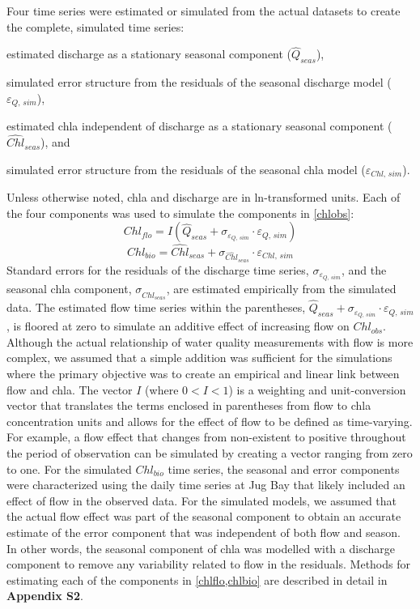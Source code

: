\documentclass[letterpaper,12pt,oneside]{article}\usepackage[]{graphicx}\usepackage[]{color}
\begin{document}
Four time series were estimated or simulated from the actual datasets to create the complete, simulated time series:\begin{inparaenum}[1\upshape)]
\item estimated discharge as a stationary seasonal component ($\widehat{Q}_{seas}$),
\item simulated error structure from the residuals of the seasonal discharge model ($\varepsilon_{Q,\,sim}$), 
\item estimated \ac{chla} independent of discharge as a stationary seasonal component ($\widehat{Chl}_{seas}$), and
\item simulated error structure from the residuals of the seasonal \ac{chla} model ($\varepsilon_{Chl,\,sim}$).
\end{inparaenum}
Unless otherwise noted, \ac{chla} and discharge are in ln-transformed units.  Each of the four components was used to simulate the components in \cref{chlobs}:
\begin{equation} \label{chlflo}
Chl_{flo} = I\left(\widehat{Q}_{seas} + \sigma_{\varepsilon_{Q,\,sim}}\cdot\varepsilon_{Q,\,sim}\right)
\end{equation}
\begin{equation} \label{chlbio}
Chl_{bio} = \widehat{Chl}_{seas} + \sigma_{\widehat{Chl}_{seas}}\cdot\varepsilon_{Chl,\,sim}
\end{equation}
Standard errors for the residuals of the discharge time series, $\sigma_{\varepsilon_{Q,\,sim}}$, and the seasonal \ac{chla} component, $\sigma_{\widehat{Chl}_{seas}}$, are estimated empirically from the simulated data.  The estimated flow time series within the parentheses, $\widehat{Q}_{seas} + \sigma_{\varepsilon_{Q,\,sim}}\cdot\varepsilon_{Q,\,sim}$, is floored at zero to simulate an additive effect of increasing flow on $Chl_{obs}$.  Although the actual relationship of water quality measurements with flow is more complex, we assumed that a simple addition was sufficient for the simulations where the primary objective was to create an empirical and linear link between flow and \ac{chla}. The vector $I$  (where $0 < I < 1$) is a weighting and unit-conversion vector that translates the terms enclosed in parentheses from flow to \ac{chla} concentration units and allows for the effect of flow to be defined as time-varying. For example, a flow effect that changes from non-existent to positive throughout the period of observation can be simulated by creating a vector ranging from zero to one. For the simulated $Chl_{bio}$ time series, the seasonal and error components were characterized using the daily time series at Jug Bay that likely included an effect of flow in the observed data.  For the simulated models, we assumed that the actual flow effect was part of the seasonal component to obtain an accurate estimate of the error component that was independent of both flow and season.  In other words, the seasonal component of \ac{chla} was modelled with a discharge component to remove any variability related to flow in the residuals. Methods for estimating each of the components in \cref{chlflo,chlbio} are described in detail in {\bf Appendix S2}.
\end{document}
